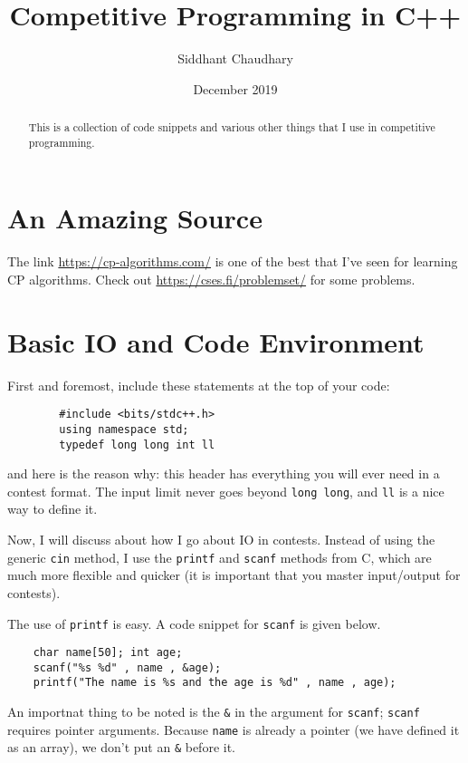 \documentclass[12pt,a4paper]{amsart}
\numberwithin{equation}{section}
\theoremstyle{definition}
\begin{document}
\title{Competitive Programming in C++}
\author{Siddhant Chaudhary}
\date{December 2019}

\maketitle
    
\begin{abstract}
This is a collection of code snippets and various other things that I use in competitive programming.
\end{abstract}
    
\tableofcontents

\section{An Amazing Source}
\noindent The link \url{https://cp-algorithms.com/} is one of the best that I've seen for learning CP algorithms. Check out \url{https://cses.fi/problemset/} for some problems. 

\section{Basic IO and Code Environment}
\noindent First and foremost, include these statements at the top of your code:
    \begin{lstlisting}
        #include <bits/stdc++.h>
        using namespace std; 
        typedef long long int ll
    \end{lstlisting}
and here is the reason why: this header has everything you will ever need in a contest format. The input limit never goes beyond \verb|long long|, and \verb|ll| is a nice way to define it. 

\noindent Now, I will discuss about how I go about IO in contests. Instead of using the generic \verb|cin| method, I use the \verb|printf| and \verb|scanf| methods from C, which are much more flexible and quicker (it is important that you master input/output for contests). 

\noindent The use of \verb|printf| is easy. A code snippet for \verb|scanf| is given below.
\begin{lstlisting}
    char name[50]; int age;
    scanf("%s %d" , name , &age);
    printf("The name is %s and the age is %d" , name , age);
\end{lstlisting}
An importnat thing to be noted is the \verb|&| in the argument for \verb|scanf|; \verb|scanf| requires pointer arguments. Because \verb|name| is already a pointer (we have defined it as an array), we don't put an \verb|&| before it.
\end{document}
